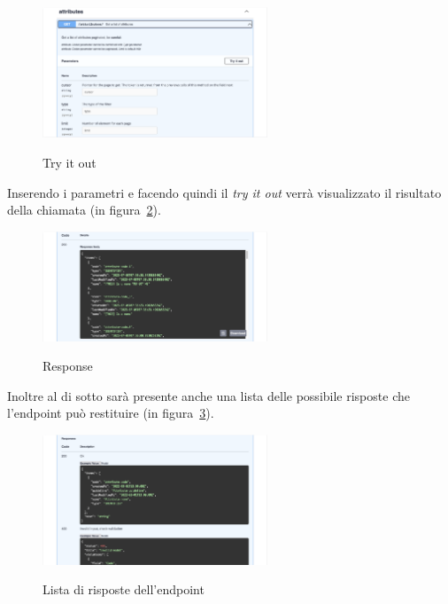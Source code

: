 \begin{figure}[ht]
  \centering
  \includegraphics[width=0.6\textwidth, alt={Sezione try it out di un endpoint}]{images/frontend/TryItOut.jpg}
  \caption{Try it out}\label{fig:try-it-out}
\end{figure}

Inserendo i parametri e facendo quindi il \textit{try it out} verrà visualizzato il risultato della chiamata (in figura~\ref{fig:response}).

\begin{figure}[ht]
  \centering
  \includegraphics[width=0.6\textwidth, alt={Sezione per la visualizzazione della risposta di un endpoint}]{images/frontend/TryItOut3.jpg}
  \caption{Response}\label{fig:response}
\end{figure}

Inoltre al di sotto sarà presente anche una lista delle possibile risposte che l'endpoint può restituire (in figura~\ref{fig:response-list}).

\begin{figure}[ht]
  \centering
  \includegraphics[width=0.6\textwidth, alt={Sezione per la visualizzazione delle possibili risposte di un endpoint}]{images/frontend/TryItOut4.jpg}
  \caption{Lista di risposte dell'endpoint}\label{fig:response-list}
\end{figure}

